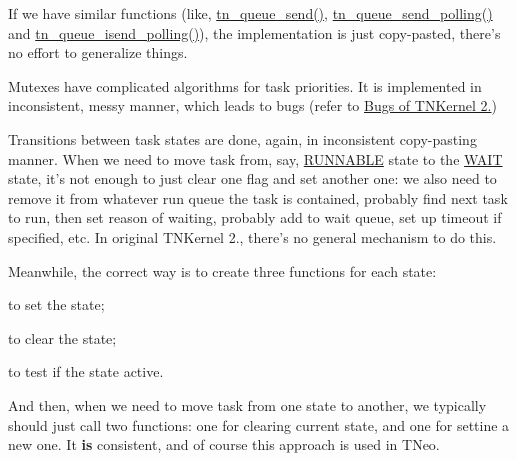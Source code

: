 \begin{DoxyItemize}
\item If we have similar functions (like, {\ttfamily \hyperlink{tn__dqueue_8h_a043dd3133a57489d7d10f53be6939957}{tn\+\_\+queue\+\_\+send()}}, {\ttfamily \hyperlink{tn__dqueue_8h_af60c61c12ed90f4bcc7d13ca4da8562b}{tn\+\_\+queue\+\_\+send\+\_\+polling()}} and {\ttfamily \hyperlink{tn__dqueue_8h_ac059f15f07625ca25e4aac5790cce1ea}{tn\+\_\+queue\+\_\+isend\+\_\+polling()}}), the implementation is just copy-\/pasted, there's no effort to generalize things.
\item Mutexes have complicated algorithms for task priorities. It is implemented in inconsistent, messy manner, which leads to bugs (refer to \hyperlink{why_reimplement_why_reimplement__bugs}{Bugs of T\+N\+Kernel 2.})
\item Transitions between task states are done, again, in inconsistent copy-\/pasting manner. When we need to move task from, say, \hyperlink{tn__tasks_8h_a5e12e8a0ab280b515f44bf3fee1210a6a02783ac7808aeda318a6f506b7a276dc}{{\ttfamily R\+U\+N\+N\+A\+B\+L\+E}} state to the \hyperlink{tn__tasks_8h_a5e12e8a0ab280b515f44bf3fee1210a6aaa3dfaf2bb5992e0cef981618ce30d56}{{\ttfamily W\+A\+I\+T}} state, it's not enough to just clear one flag and set another one\+: we also need to remove it from whatever run queue the task is contained, probably find next task to run, then set reason of waiting, probably add to wait queue, set up timeout if specified, etc. In original T\+N\+Kernel 2., there's no general mechanism to do this.

Meanwhile, the correct way is to create three functions for each state\+:
\begin{DoxyItemize}
\item to set the state;
\item to clear the state;
\item to test if the state active.
\end{DoxyItemize}

And then, when we need to move task from one state to another, we typically should just call two functions\+: one for clearing current state, and one for settine a new one. It {\bfseries is} consistent, and of course this approach is used in T\+Neo.
\end{DoxyItemize}

